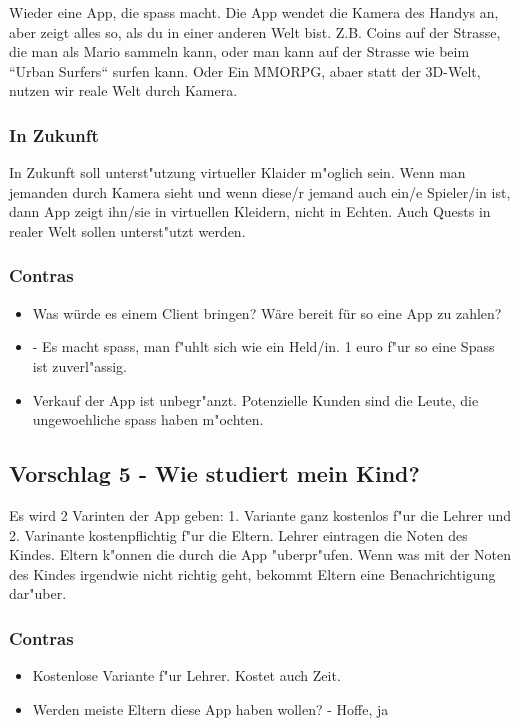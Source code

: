 Wieder eine App, die spass macht. Die App wendet die Kamera des Handys an, aber zeigt alles so, als du in einer anderen Welt bist. Z.B. Coins auf der Strasse, die man als Mario sammeln kann, oder man kann auf der Strasse wie beim ``Urban Surfers`` surfen kann. Oder Ein MMORPG, abaer statt der 3D-Welt, nutzen wir reale Welt durch Kamera.

\subsubsection{In Zukunft} In Zukunft soll unterst"utzung virtueller Klaider m"oglich sein. Wenn man jemanden durch Kamera sieht und wenn diese/r jemand auch ein/e Spieler/in ist, dann App zeigt ihn/sie in virtuellen Kleidern, nicht in Echten. Auch Quests in realer Welt sollen unterst"utzt werden.

\subsubsection{Contras}
\begin{itemize}
\item Was würde es einem Client bringen? Wäre bereit für so eine App zu zahlen?
\item - Es macht spass, man f"uhlt sich wie ein Held/in. 1 euro f"ur so eine Spass ist zuverl"assig.
\item Verkauf der App ist unbegr"anzt. Potenzielle Kunden sind die Leute, die ungewoehliche spass haben m"ochten.
\end{itemize}

\subsection{Vorschlag 5 - Wie studiert mein Kind?}

Es wird 2 Varinten der App geben: 1. Variante ganz kostenlos f"ur die Lehrer und 2. Varinante kostenpflichtig f"ur die Eltern. Lehrer eintragen die Noten des Kindes. Eltern k"onnen die durch die App "uberpr"ufen. Wenn was mit der Noten des Kindes irgendwie nicht richtig geht, bekommt Eltern eine Benachrichtigung dar"uber.

\subsubsection{Contras}
\begin{itemize}
\item Kostenlose Variante f"ur Lehrer. Kostet auch Zeit.
\item Werden meiste Eltern diese App haben wollen? - Hoffe, ja

\end{itemize}





















